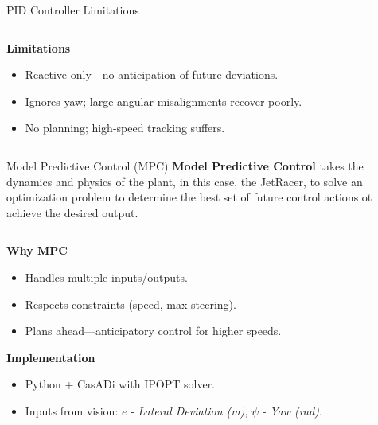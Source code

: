 \documentclass[aspectratio=169,12pt]{beamer}
\begin{document}
\begin{frame}[t]{PID Controller Limitations}
  \vspace*{-0.3em}
    \begin{columns}[T]
    \begin{column}{0.52\textwidth}
      \textbf{Limitations}
      \begin{itemize}\setlength{\itemsep}{0.35em}
        \item Reactive only—no anticipation of future deviations.
        \item Ignores yaw; large angular misalignments recover poorly.
        \item No planning; high-speed tracking suffers.
      \end{itemize}
    \end{column}
    \begin{column}{0.48\textwidth}
      \centering

    \end{column}
  \end{columns}
\end{frame}

\begin{frame}[t]{Model Predictive Control (MPC)}
  \vspace*{-0.3em}
  \textbf{Model Predictive Control} takes the dynamics and physics of the plant, in this case, the JetRacer, to solve an optimization problem to determine the best set of future control actions ot achieve the desired output.
  \vspace{0.4em}
  \begin{columns}[T]
    \begin{column}{0.58\textwidth}
      \textbf{Why MPC}
      \begin{itemize}\setlength{\itemsep}{0.35em}
        \item Handles multiple inputs/outputs.
        \item Respects constraints (speed, max steering).
        \item Plans ahead—anticipatory control for higher speeds.
      \end{itemize}
      \vspace{0.5em}
      \textbf{Implementation}
      \begin{itemize}\setlength{\itemsep}{0.35em}
        \item Python + CasADi with IPOPT solver.
        \item Inputs from vision: \(e\) - \emph{Lateral Deviation (m)}, \(\psi\) - \emph{Yaw (rad)}.
      \end{itemize}
    \end{column}
    \begin{column}{0.42\textwidth}
      \centering

    \end{column}
  \end{columns}
\end{frame}
\end{document}
